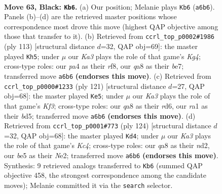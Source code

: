 \documentclass[11pt]{article}
\begin{document}
\begin{figure}[p]\centering
\begin{subfigure}{0.46\textwidth}\centering
\resizebox{\linewidth}{!}{%
\newchessgame
\chessboard[
  setfen={Q7/8/k7/p2pBp2/P6r/8/8/RN4K1 b - - 7 63},
  showmover=false,
  pgfstyle=straightmove, color=movearrow, markmove={a6-b6}
]}
\caption{}
\end{subfigure}\hfill
\begin{subfigure}{0.46\textwidth}\centering
\resizebox{\linewidth}{!}{%
\newchessgame
\chessboard[
  setfen={5R2/4B3/4p3/3p2k1/3P2p1/1r6/5K2/8 b - - 11 57},
  showmover=false,
  pgfstyle=straightmove, color=movearrow, markmove={g5-h5}
]}
\caption{}
\end{subfigure}
\\[4pt]
\begin{subfigure}{0.46\textwidth}\centering
\resizebox{\linewidth}{!}{%
\newchessgame
\chessboard[
  setfen={8/5p2/3R1k2/3B3p/7P/p1K2P2/5r2/8 b - - 0 61},
  showmover=false,
  pgfstyle=straightmove, color=movearrow, markmove={f6-e5}
]}
\caption{}
\end{subfigure}\hfill
\begin{subfigure}{0.46\textwidth}\centering
\resizebox{\linewidth}{!}{%
\newchessgame
\chessboard[
  setfen={8/6k1/8/4r3/1PK4p/4p3/2PnN3/3R4 w - - 5 63},
  showmover=false,
  pgfstyle=straightmove, color=movearrow, markmove={c4-d4}
]}
\caption{}
\end{subfigure}
\caption{\textbf{Move 63, Black: \texttt{Kb6}.} (a) Our position; Melanie plays \texttt{Kb6} (\texttt{a6b6}). Panels (b)--(d) are the retrieved master positions whose correspondence most drove this move (highest QAP objective among those that transfer to it). (b) Retrieved from \texttt{ccrl\_top\_p0002\#1986} (ply 113) [structural distance $d$=32, QAP obj=69]: the master played \texttt{Kh5}; under $\mu$ our \emph{Ka3} plays the role of that game's \emph{Kg4}; cross-type roles: our \emph{p}a4 as their \emph{r}f8, our \emph{q}a8 as their \emph{b}e7; transferred move \texttt{a6b6} \textbf{(endorses this move)}. (c) Retrieved from \texttt{ccrl\_top\_p0000\#1233} (ply 121) [structural distance $d$=27, QAP obj=68]: the master played \texttt{Ke5}; under $\mu$ our \emph{Ka3} plays the role of that game's \emph{Kf3}; cross-type roles: our \emph{q}a8 as their \emph{r}d6, our \emph{r}a1 as their \emph{b}d5; transferred move \texttt{a6b6} \textbf{(endorses this move)}. (d) Retrieved from \texttt{ccrl\_top\_p0001\#773} (ply 124) [structural distance $d$=32, QAP obj=68]: the master played \texttt{Kd4}; under $\mu$ our \emph{Ka3} plays the role of that game's \emph{Kc4}; cross-type roles: our \emph{q}a8 as their \emph{n}d2, our \emph{b}e5 as their \emph{N}e2; transferred move \texttt{a6b6} \textbf{(endorses this move)}. Synthesis: 9 retrieved analogs transferred to \texttt{Kb6} (summed QAP objective 458, the strongest correspondence among the candidate moves); Melanie committed it via the \texttt{search} selector.}
\label{fig:thought-m125}
\end{figure}
\end{document}
